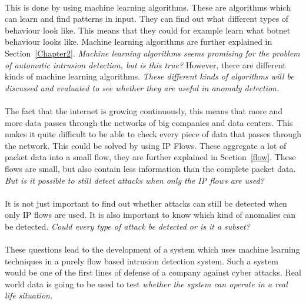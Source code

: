 \\
This is done by using machine learning algorithms. These are algorithms which can learn and find patterns in input. They can find out what different types of behaviour look like. This means that they could for example learn what botnet behaviour looks like. Machine learning algorithms are further explained in Section~\ref{Chapter2}. \textit{Machine learning algorithms seems promising for the problem of automatic intrusion detection, but is this true?} However, there are different kinds of machine learning algorithms. \textit{These different kinds of algorithms will be discussed and evaluated to see whether they are useful in anomaly detection.} \\
\\
The fact that the internet is growing continuously, this means that more and more data passes through the networks of big companies and data centers. This makes it quite difficult to be able to check every piece of data that passes through the network. This could be solved by using IP Flows. These aggregate a lot of packet data into a small flow, they are further explained in Section~\ref{flow}. These flows are small, but also contain less information than the complete packet data. \textit{But is it possible to still detect attacks when only the IP flows are used?} \\
\\
It is not just important to find out whether attacks can still be detected when only IP flows are used. It is also important to know which kind of anomalies can be detected. \textit{Could every type of attack be detected or is it a subset? } \\
\\
These questions lead to the development of a system which uses machine learning techniques in a purely flow based intrusion detection system. Such a system would be one of the first lines of defense of a company against cyber attacks. Real world data is going to be used to test \textit{whether the system can operate in a real life situation.}


